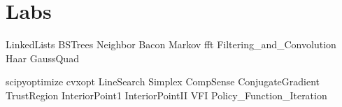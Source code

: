 \documentclass[nociteref]{SIAM-GH-book}
\begin{document}
\part{Labs} %
{LinkedLists}
{BSTrees}
{Neighbor}
{Bacon}
{Markov}
{fft}
{Filtering_and_Convolution}
{Haar}
{GaussQuad}

{scipyoptimize}
{cvxopt}
{LineSearch}
{Simplex}
{CompSense}
{ConjugateGradient}
{TrustRegion}
{InteriorPoint1}
{InteriorPointII}
{VFI}
{Policy_Function_Iteration}
\end{document}
